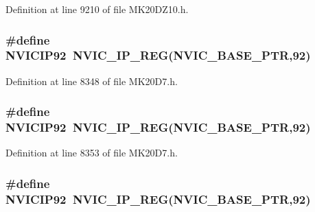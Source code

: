 Definition at line 9210 of file M\+K20\+D\+Z10.\+h.

\subsubsection[{\texorpdfstring{N\+V\+I\+C\+I\+P92}{NVICIP92}}]{\setlength{\rightskip}{0pt plus 5cm}\#define N\+V\+I\+C\+I\+P92~{\bf N\+V\+I\+C\+\_\+\+I\+P\+\_\+\+R\+EG}({\bf N\+V\+I\+C\+\_\+\+B\+A\+S\+E\+\_\+\+P\+TR},92)}\hypertarget{group___n_v_i_c___register___accessor___macros_ga7ea4427ba738d72db03d1ffd664731d2}{}\label{group___n_v_i_c___register___accessor___macros_ga7ea4427ba738d72db03d1ffd664731d2}


Definition at line 8348 of file M\+K20\+D7.\+h.

\subsubsection[{\texorpdfstring{N\+V\+I\+C\+I\+P92}{NVICIP92}}]{\setlength{\rightskip}{0pt plus 5cm}\#define N\+V\+I\+C\+I\+P92~{\bf N\+V\+I\+C\+\_\+\+I\+P\+\_\+\+R\+EG}({\bf N\+V\+I\+C\+\_\+\+B\+A\+S\+E\+\_\+\+P\+TR},92)}\hypertarget{group___n_v_i_c___register___accessor___macros_ga7ea4427ba738d72db03d1ffd664731d2}{}\label{group___n_v_i_c___register___accessor___macros_ga7ea4427ba738d72db03d1ffd664731d2}


Definition at line 8353 of file M\+K20\+D7.\+h.

\subsubsection[{\texorpdfstring{N\+V\+I\+C\+I\+P92}{NVICIP92}}]{\setlength{\rightskip}{0pt plus 5cm}\#define N\+V\+I\+C\+I\+P92~{\bf N\+V\+I\+C\+\_\+\+I\+P\+\_\+\+R\+EG}({\bf N\+V\+I\+C\+\_\+\+B\+A\+S\+E\+\_\+\+P\+TR},92)}\hypertarget{group___n_v_i_c___register___accessor___macros_ga7ea4427ba738d72db03d1ffd664731d2}{}\label{group___n_v_i_c___register___accessor___macros_ga7ea4427ba738d72db03d1ffd664731d2}


